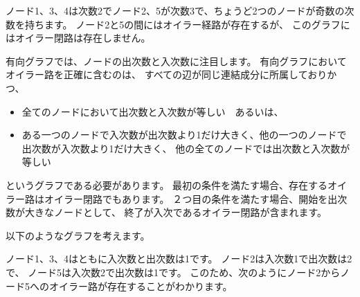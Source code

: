 ノード1、3、4は次数2でノード2、5が次数3で、ちょうど2つのノードが奇数の次数を持ちます。
ノード2と5の間にはオイラー経路が存在するが、
このグラフにはオイラー閉路は存在しません。

有向グラフでは、ノードの出次数と入次数に注目します。
有向グラフにおいてオイラー路を正確に含むのは、
すべての辺が同じ連結成分に所属しておりかつ、

\begin{itemize}
\item 全てのノードにおいて出次数と入次数が等しい　あるいは、
\item ある一つのノードで入次数が出次数より1だけ大きく、他の一つのノードで出次数が入次数より1だけ大きく、
他の全てのノードでは出次数と入次数が等しい
\end{itemize}

というグラフである必要があります。
最初の条件を満たす場合、存在するオイラー路はオイラー閉路でもあります。
２つ目の条件を満たす場合、開始を出次数が大きなノードとして、
終了が入次であるオイラー閉路が含まれます。

以下のようなグラフを考えます。
\begin{center}
\end{center}

ノード1、3、4はともに入次数と出次数は1です。
ノード2は入次数1で出次数は2で、
ノード5は入次数2で出次数は1です。
このため、次のようにノード2からノード5へのオイラー路が存在することがわかります。

